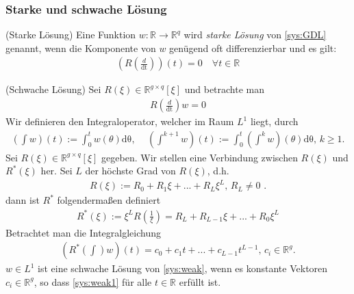 \subsubsection{Starke und schwache Lösung}
\begin{defi}(Starke Lösung) Eine Funktion $w : \mathbb{R} \rightarrow \mathbb{R}^q$ wird \textit{starke Lösung} von \ref{sys:GDL} genannt, wenn die Komponente von $w$ genügend oft differenzierbar und es gilt: 
\begin{align}
	(R(\frac{d}{\mathrm{dt}}))(t) = 0 \quad \forall t \in \mathbb{R}
\end{align}
\end{defi}
\begin{defi}(Schwache Lösung) Sei $R(\xi) \in \mathbb{R}^{g \times q}[\xi]$ und betrachte man
\begin{align}
	R(\frac{d}{\mathrm{dt}}) w = 0 \label{sys:weak}
\end{align} 
Wir definieren den Integraloperator, welcher im Raum $L^1$ liegt, durch
\begin{align}
	(\int w )(t) := \int_0^t w(\theta) \mathrm{d\theta} \text{, } \quad  (\int^{k+1} w )(t) := \int_0^t (\int^k w )(\theta) \mathrm{d\theta} \text{, } k \geq 1 \text{.}
\end{align}
Sei $R(\xi) \in \mathbb{R}^{g \times q}[\xi]$ gegeben. Wir stellen eine Verbindung zwischen $R(\xi)$ und $R^*(\xi)$ her. Sei $L$ der höchste Grad von $R(\xi)$, d.h.
\begin{align}
	R(\xi) := R_0 + R_1 \xi + ... + R_L \xi^L \text{, } R_L \neq 0 \text{ .}
\end{align}
dann ist $R^*$ folgendermaßen definiert
\begin{align}
	R^*(\xi) := \xi^L R(\frac{1}{\xi}) =R_L + R_{L-1} \xi + ... + R_0 \xi^L
\end{align}
Betrachtet man die Integralgleichung
\begin{align}
	(R^*(\int) w ) (t) = c_0 + c_1 t + ... + c_{L-1} t ^{L-1} \text{, } c_i \in \mathbb{R}^g \text{.} \label{sys:weak1}
\end{align}
$w \in L^1$ ist eine schwache Lösung von \ref{sys:weak}, wenn es konstante Vektoren $c_i \in \mathbb{R}^g$, so dass \ref{sys:weak1} für alle $t \in \mathbb{R}$ erfüllt ist. 
\end{defi}


